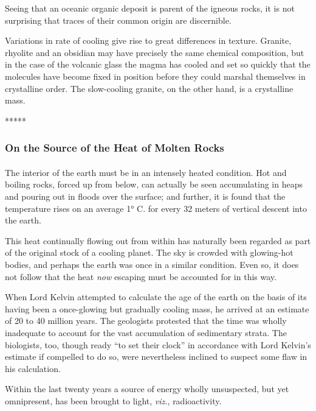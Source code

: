 \documentclass[a4paper, 12pt, oneside]{article}
\begin{document}
Seeing that an oceanic organic deposit is parent of the igneous rocks, it is not surprising that traces of their common origin are discernible.

Variations in rate of cooling give rise to great differences in texture. Granite, rhyolite and an obsidian may have precisely the same chemical composition, but in the case of the volcanic glass the magma has cooled and set so quickly that the molecules have become fixed in position before they could marshal themselves in crystalline order. The slow-cooling granite, on the other hand, is a crystalline mass.

\centerline{*\hspace{15mm}*\hspace{15mm}*\hspace{15mm}*\hspace{15mm}*}
\bigskip

\subsubsection{On the Source of the Heat of Molten Rocks}
\paragraph{}
The interior of the earth must be in an intensely heated condition. Hot and boiling rocks, forced up from below, can actually be seen accumulating in heaps and pouring out in floods over the surface; and further, it is found that the temperature rises on an average 1° C. for every 32 meters of vertical descent into the earth.

This heat continually flowing out from within has naturally been regarded as part of the original stock of a cooling planet. The sky is crowded with glowing-hot bodies, and perhaps the earth was once in a similar condition. Even so, it does not follow that the heat \emph{now} escaping must be accounted for in this way.

When Lord Kelvin attempted to calculate the age of the earth on the basis of its having been a once-glowing but gradually cooling mass, he arrived at an estimate of 20 to 40 million years. The geologists protested that the time was wholly inadequate to account for the vast accumulation of sedimentary strata. The biologists, too, though ready ``to set their clock'' in accordance with Lord Kelvin's estimate if compelled to do so, were nevertheless inclined to suspect some flaw in his calculation.

Within the last twenty years a source of energy wholly unsuspected, but yet omnipresent, has been brought to light, \emph{viz.}, radioactivity.
\end{document}
